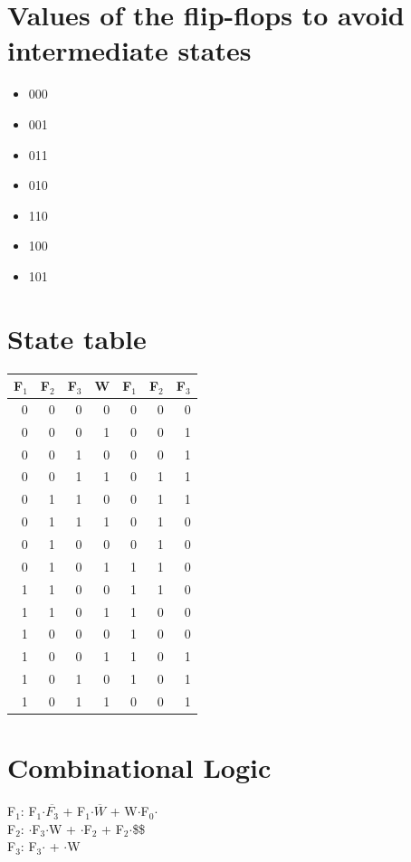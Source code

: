 \documentclass[11pt]{article}
\begin{document}
\section{Values of the flip-flops to avoid intermediate states}
\label{sec-4}
\begin{itemize}
\item 000
\item 001
\item 011
\item 010
\item 110
\item 100
\item 101
\end{itemize}

\section{State table}
\label{sec-5}
\begin{center}
\begin{tabular}{rrrrrrr}
F$_{\text{1}}$ & F$_{\text{2}}$ & F$_{\text{3}}$ & W & F$_{\text{1}}$ & F$_{\text{2}}$ & F$_{\text{3}}$\\
\hline
0 & 0 & 0 & 0 & 0 & 0 & 0\\
0 & 0 & 0 & 1 & 0 & 0 & 1\\
0 & 0 & 1 & 0 & 0 & 0 & 1\\
0 & 0 & 1 & 1 & 0 & 1 & 1\\
0 & 1 & 1 & 0 & 0 & 1 & 1\\
0 & 1 & 1 & 1 & 0 & 1 & 0\\
0 & 1 & 0 & 0 & 0 & 1 & 0\\
0 & 1 & 0 & 1 & 1 & 1 & 0\\
1 & 1 & 0 & 0 & 1 & 1 & 0\\
1 & 1 & 0 & 1 & 1 & 0 & 0\\
1 & 0 & 0 & 0 & 1 & 0 & 0\\
1 & 0 & 0 & 1 & 1 & 0 & 1\\
1 & 0 & 1 & 0 & 1 & 0 & 1\\
1 & 0 & 1 & 1 & 0 & 0 & 1\\
\end{tabular}
\end{center}

\section{Combinational Logic}
\label{sec-6}
F$_{\text{1}}$: F$_{\text{1}}$$\cdot$$\overline{F_{3}}$ + F$_{\text{1}}$$\cdot$$\overline{W}$ + W$\cdot$F$_{\text{0}}$$\cdot$\\
F$_{\text{2}}$: $\cdot$F$_{\text{3}}$$\cdot$W + $\cdot$F$_{\text{2}}$ + F$_{\text{2}}$$\cdot$\$\$\\
F$_{\text{3}}$: F$_{\text{3}}$$\cdot$ + $\cdot$W
\end{document}

